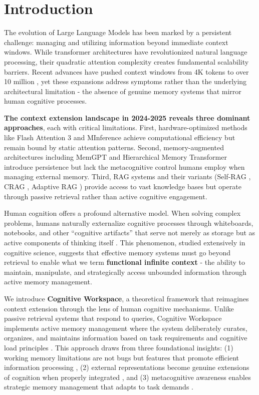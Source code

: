 \documentclass[10pt,twocolumn]{article}
\begin{document}
\section{Introduction}

The evolution of Large Language Models has been marked by a persistent challenge: managing and utilizing information beyond immediate context windows. While transformer architectures \cite{vaswani2017attention} have revolutionized natural language processing, their quadratic attention complexity creates fundamental scalability barriers. Recent advances have pushed context windows from 4K tokens to over 10 million \cite{reid2024gemini}, yet these expansions address symptoms rather than the underlying architectural limitation - the absence of genuine memory systems that mirror human cognitive processes.

\textbf{The context extension landscape in 2024-2025 reveals three dominant approaches}, each with critical limitations. First, hardware-optimized methods like Flash Attention 3 and MInference \cite{jiang2024minference} achieve computational efficiency but remain bound by static attention patterns. Second, memory-augmented architectures including MemGPT \cite{packer2024memgpt} and Hierarchical Memory Transformer \cite{yu2024hmt} introduce persistence but lack the metacognitive control humans employ when managing external memory. Third, RAG systems and their variants (Self-RAG \cite{asai2023self}, CRAG \cite{yan2024corrective}, Adaptive RAG \cite{jeong2024adaptive}) provide access to vast knowledge bases but operate through passive retrieval rather than active cognitive engagement.

Human cognition offers a profound alternative model. When solving complex problems, humans naturally externalize cognitive processes through whiteboards, notebooks, and other ``cognitive artifacts'' that serve not merely as storage but as active components of thinking itself \cite{kirsh1995intelligent, norman1991cognitive}. This phenomenon, studied extensively in cognitive science, suggests that effective memory systems must go beyond retrieval to enable what we term \textbf{functional infinite context} - the ability to maintain, manipulate, and strategically access unbounded information through active memory management.

We introduce \textbf{Cognitive Workspace}, a theoretical framework that reimagines context extension through the lens of human cognitive mechanisms. Unlike passive retrieval systems that respond to queries, Cognitive Workspace implements active memory management where the system deliberately curates, organizes, and maintains information based on task requirements and cognitive load principles \cite{sweller2019cognitive}. This approach draws from three foundational insights: (1) working memory limitations are not bugs but features that promote efficient information processing \cite{miller1956magical, cowan2001magical}, (2) external representations become genuine extensions of cognition when properly integrated \cite{clark1998extended}, and (3) metacognitive awareness enables strategic memory management that adapts to task demands \cite{flavell1979metacognition}.
\end{document}
